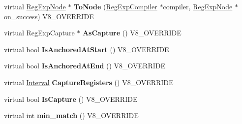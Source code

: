 \begin{DoxyCompactItemize}
\item 
\hypertarget{classv8_1_1internal_1_1_v8___f_i_n_a_l_aa183d4adede0c6af0c092eeebf59c194}{}virtual \hyperlink{classv8_1_1internal_1_1_reg_exp_node}{Reg\+Exp\+Node} $\ast$ {\bfseries To\+Node} (\hyperlink{classv8_1_1internal_1_1_reg_exp_compiler}{Reg\+Exp\+Compiler} $\ast$compiler, \hyperlink{classv8_1_1internal_1_1_reg_exp_node}{Reg\+Exp\+Node} $\ast$on\+\_\+success) V8\+\_\+\+O\+V\+E\+R\+R\+I\+D\+E\label{classv8_1_1internal_1_1_v8___f_i_n_a_l_aa183d4adede0c6af0c092eeebf59c194}

\item 
\hypertarget{classv8_1_1internal_1_1_v8___f_i_n_a_l_aa85640e2e9596609acc29b959bb29deb}{}virtual Reg\+Exp\+Capture $\ast$ {\bfseries As\+Capture} () V8\+\_\+\+O\+V\+E\+R\+R\+I\+D\+E\label{classv8_1_1internal_1_1_v8___f_i_n_a_l_aa85640e2e9596609acc29b959bb29deb}

\item 
\hypertarget{classv8_1_1internal_1_1_v8___f_i_n_a_l_a1303853ed1afec044f4a5c65f06e977b}{}virtual bool {\bfseries Is\+Anchored\+At\+Start} () V8\+\_\+\+O\+V\+E\+R\+R\+I\+D\+E\label{classv8_1_1internal_1_1_v8___f_i_n_a_l_a1303853ed1afec044f4a5c65f06e977b}

\item 
\hypertarget{classv8_1_1internal_1_1_v8___f_i_n_a_l_af12a212dba3f2fafc3dc142311b35977}{}virtual bool {\bfseries Is\+Anchored\+At\+End} () V8\+\_\+\+O\+V\+E\+R\+R\+I\+D\+E\label{classv8_1_1internal_1_1_v8___f_i_n_a_l_af12a212dba3f2fafc3dc142311b35977}

\item 
\hypertarget{classv8_1_1internal_1_1_v8___f_i_n_a_l_ac1bfb16ce46192182988ae324c15decf}{}virtual \hyperlink{classv8_1_1internal_1_1_interval}{Interval} {\bfseries Capture\+Registers} () V8\+\_\+\+O\+V\+E\+R\+R\+I\+D\+E\label{classv8_1_1internal_1_1_v8___f_i_n_a_l_ac1bfb16ce46192182988ae324c15decf}

\item 
\hypertarget{classv8_1_1internal_1_1_v8___f_i_n_a_l_a8f0d849d2bdc08d4f4ea34962a27544f}{}virtual bool {\bfseries Is\+Capture} () V8\+\_\+\+O\+V\+E\+R\+R\+I\+D\+E\label{classv8_1_1internal_1_1_v8___f_i_n_a_l_a8f0d849d2bdc08d4f4ea34962a27544f}

\item 
\hypertarget{classv8_1_1internal_1_1_v8___f_i_n_a_l_ac4abdb29d336dc24ef96695ac805b1ac}{}virtual int {\bfseries min\+\_\+match} () V8\+\_\+\+O\+V\+E\+R\+R\+I\+D\+E\label{classv8_1_1internal_1_1_v8___f_i_n_a_l_ac4abdb29d336dc24ef96695ac805b1ac}


\end{DoxyCompactItemize}

